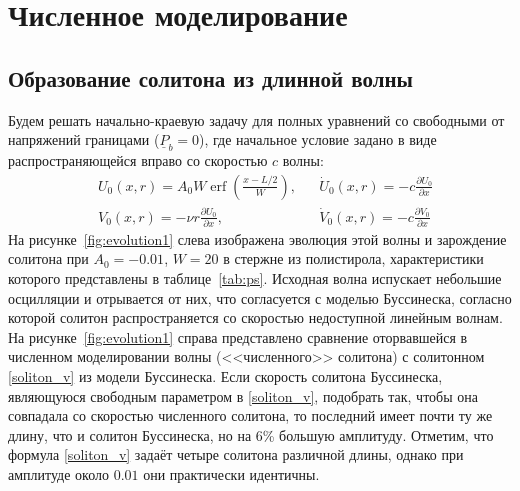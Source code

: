 \documentclass[12pt, a4paper]{report}
\DeclareMathOperator{\erf}{erf}
\newcommand{\lb}{\left (}
\newcommand{\rb}{\right )}
\newcommand{\vect}[1]{\underline{#1}}
\newcommand{\pdiff}[2]{\frac{\partial #1}{\partial #2}}
\begin{document}
\section{Численное моделирование}


\subsection{Образование солитона из длинной волны}
Будем решать начально-краевую задачу для полных уравнений со свободными от напряжений границами ($\vect{P}_b=0$), где начальное условие задано в виде распространяющейся вправо со скоростью $c$ волны:
\begin{align}
\label{3_ic_u}
& U_0 (x, r) = A_0 W \erf\lb \frac{x - L/2}{W}\rb,&  &\dot{U}_0 (x, r) = -c \pdiff{U_0}{x}\\
\label{3_ic_v}
& V_0(x, r) = -\nu r \pdiff{U_0}{x},& &\dot{V}_0 (x, r) = -c \pdiff{V_0}{x}
\end{align}
На рисунке~\ref{fig:evolution1} слева изображена эволюция этой волны и зарождение солитона при $A_0=-0.01$, $W=20$ в стержне из полистирола, характеристики которого представлены в таблице~\ref{tab:ps}. Исходная волна испускает небольшие осцилляции и отрывается от них, что согласуется с моделью Буссинеска, согласно которой солитон распространяется со скоростью недоступной линейным волнам. На рисунке~\ref{fig:evolution1} справа представлено сравнение оторвавшейся в численном моделировании волны (<<численного>> солитона) с солитонном \eqref{soliton_v} из модели Буссинеска.
Если скорость солитона Буссинеска, являющуюся свободным параметром в \eqref{soliton_v}, подобрать так, чтобы она совпадала со скоростью численного солитона, то последний имеет почти ту же длину, что и солитон Буссинеска, но на 6\% большую амплитуду.
Отметим, что формула \eqref{soliton_v} задаёт четыре солитона различной длины, однако при амплитуде около $0.01$ они практически идентичны.
\end{document}
